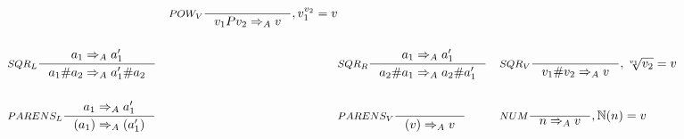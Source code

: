 \begin{align*}
&
&\inference[$POW_V$]{}
                    {v_1 P v_2 \Rightarrow_A v}
										{, v_1 ^ {v_2} = v}
\\\\
&\inference[$SQR_L$]{a_1  \Rightarrow_A a_1'}
                    {a_1 \# a_2 \Rightarrow_A a_1' \# a_2}
&
&\inference[$SQR_R$]{a_1 \Rightarrow_A a_1'}
                    {a_2 \# a_1 \Rightarrow_A a_2 \# a_1'}
&
&\inference[$SQR_V$]{}
                    {v_1 \# v_2 \Rightarrow_A v}
										{, \sqrt[v_1]{v_2} = v}
\\\\
&\inference[$PARENS_L$]{a_1 \Rightarrow_A a_1'}
                       {(a_1) \Rightarrow_A (a_1')}
&
&\inference[$PARENS_V$]{}
                       {(v) \Rightarrow_A v}
&
&\inference[$NUM$]{}
                       {n \Rightarrow_A v}
											 {, \mathbb{N}(n) = v}
\end{align*}
